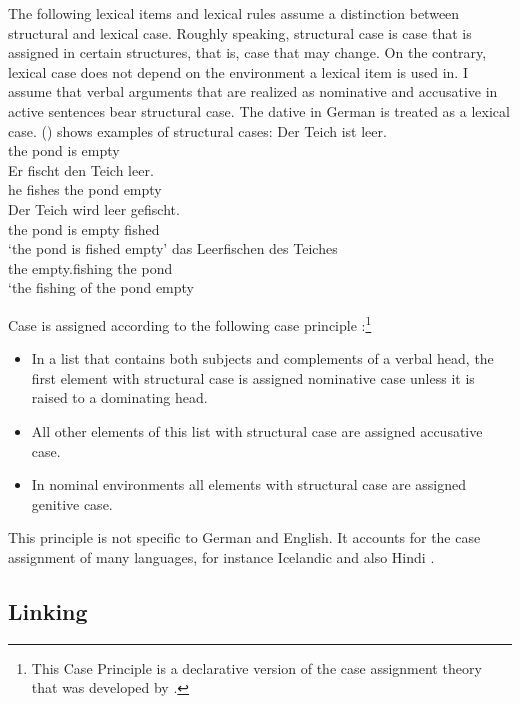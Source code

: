 The following lexical items and lexical rules assume a distinction between structural and lexical
case. Roughly speaking, structural case is case that is assigned in certain structures, that is,
case that may change. On the contrary, lexical case does not depend on the environment a
lexical item is used in. I assume that verbal arguments that are realized as nominative and
accusative in active sentences bear structural case. The dative in German is treated as a lexical
case. () shows examples of structural cases:
\eal
\ex 
\gll Der Teich ist leer.\\
     the pond is empty\\
\ex 
\gll Er fischt den Teich leer.\\
     he fishes the pond empty\\
\ex 
\gll Der Teich wird leer gefischt.\\
     the pond is empty fished\\
\glt `the pond is fished empty'
\ex 
\gll das Leerfischen des Teiches\\
     the empty.fishing the pond\\
\glt `the fishing of the pond empty
\zl

Case is assigned according to the following case principle \citep{Prze99,Meurers99b}:\footnote{%
  This Case Principle is a declarative version of the case assignment theory that was developed by
  \citet*{YMJ87}.
}

\begin{principle-break}
\label{case-p}
\begin{itemize}
\item In a list that contains both subjects and complements of a verbal head,
the first element with structural case is assigned nominative case unless it is raised
to a dominating head.
\item All other elements of this list with structural case are assigned accusative case.
\item In nominal environments all elements with structural case are assigned genitive case.
\end{itemize}
\end{principle-break}

This principle is not specific to German and English. It accounts for the case assignment of many languages, for
instance Icelandic \citep{MuellerGermanic} and also Hindi \citep{MuellerCoreGram}.

\subsection{Linking}


